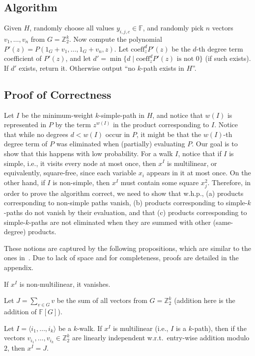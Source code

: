 \documentclass{llncs}
\newcommand{\coeff}{\mathrm{coeff}}
\newcommand{\FF}{\mathbb{F}}
\newcommand{\ZZ}{\mathbb{Z}}
\newcommand{\FG}{{\FF[G]}}
\begin{document}
\subsection{Algorithm}
Given $H$, randomly choose all values $y_{i,j,c} \in \FF$, and randomly pick $n$ vectors $v_1,\ldots,v_n$ from $G=\ZZ_2^k$. Now compute the polynomial $P'(z)=P(1_G+v_1,\ldots,1_G+v_n,z)$. Let $\coeff_z^d P'(z)$ be the $d$-th degree term coefficient of $P'(z)$, and let $d'=\min\{d \mid \coeff_z^d P'(z) \text{ is not $0$} \}$ (if such exists). If $d'$ exists, return it. Otherwise output ``no $k$-path exists in $H$''.


\subsection{Proof of Correctness}
Let $I$ be the minimum-weight $k$-simple-path in $H$, and notice that $w(I)$ is represented in $P$ by the term $z^{w(I)}$ in the product corresponding to $I$. Notice that while no degrees $d < w(I)$ occur in $P$, it might be that the $w(I)$-th degree term of $P$ was eliminated when (partially) evaluating $P$. Our goal is to show that this happens with low probability. For a walk $I$, notice that if $I$ is simple, i.e., it visits every node at most once, then $x^I$ is multilinear, or equivalently, square-free, since each variable $x_i$ appears in it at most once. On the other hand, if $I$ is non-simple, then $x^I$ must contain some square $x_j^2$. Therefore, in order to prove the algorithm correct, we need to show that w.h.p., (a) products corresponding to non-simple paths vanish, (b) products corresponding to simple-$k$-paths do not vanish by their evaluation, and that (c) products corresponding to simple-$k$-paths are not eliminated when they are summed with other (same-degree) products. 

These notions are captured by the following propositions, which are similar to the ones in~\cite{Williams09}. 
Due to lack of space and for completeness, proofs are detailed in the appendix.

\begin{proposition}\label{pro:vanish}
If $x^I$ is non-multilinear, it vanishes.
\end{proposition}

Let $J=\sum_{v \in G}v$ be the sum of all vectors from $G=\ZZ_2^k$ (addition here is the addition of $\FG$).

\begin{proposition}\label{thr:independent}
Let $I = \langle i_1,\ldots,i_k \rangle$ be a $k$-walk. If $x^I$ is multilinear (i.e., $I$ is a $k$-path), then if the vectors $v_{i_1}, \ldots , v_{i_k} \in \ZZ_2^k$ are linearly independent w.r.t.\ entry-wise addition modulo $2$, then $x^I = J$.
\end{proposition}
\end{document}
